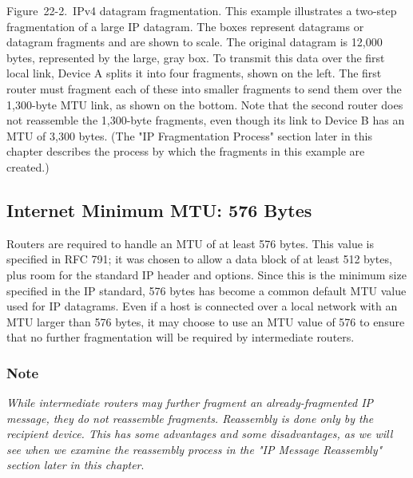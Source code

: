 \documentclass[b5paper,11pt]{memoir}
\begin{document}
\protect\hypertarget{ch22.htmlux5cux23ipv4_datagram_fragmentation_this_example}{}{}

\protect\hypertarget{ch22.htmlux5cux23I_mediaobject8_d1e23810}{}{}

Figure~22-2.~IPv4 datagram fragmentation. This example illustrates a
two-step fragmentation of a large IP datagram. The boxes represent
datagrams or datagram fragments and are shown to scale. The original
datagram is 12,000 bytes, represented by the large, gray box. To
transmit this data over the first local link, Device A splits it into
four fragments, shown on the left. The first router must fragment each
of these into smaller fragments to send them over the 1,300-byte MTU
link, as shown on the bottom. Note that the second router does not
reassemble the 1,300-byte fragments, even though its link to Device B
has an MTU of 3,300 bytes. (The "IP Fragmentation Process" section later
in this chapter describes the process by which the fragments in this
example are created.)

\subsection[Internet Minimum MTU: 576
Bytes]{\texorpdfstring{\protect\hypertarget{ch22.htmlux5cux23internet_minimum_mtu_576_bytes}{}{}Internet
Minimum MTU: 576 Bytes}{Internet Minimum MTU: 576 Bytes}}

\protect\hypertarget{ch22.htmlux5cux23idx-CHP-22-0803}{}{}Routers are
required to handle an MTU of at least 576 bytes. This value is specified
in RFC 791; it was chosen to allow a data block of at least 512 bytes,
plus room for the standard IP header and options. Since this is the
minimum size specified in the IP standard, 576 bytes has become a common
default MTU value used for IP datagrams. Even if a host is connected
over a local network with an MTU larger than 576 bytes, it may choose to
use an MTU value of 576 to ensure that no further fragmentation will be
required by intermediate routers.

\subsubsection[Note]{\texorpdfstring{\protect\hypertarget{ch22.htmlux5cux23note-82}{}{}Note}{Note}}

{\emph{While intermediate routers may further fragment an
already-fragmented IP message, they do not reassemble fragments.
Reassembly is done only by the recipient device. This has some
advantages and some disadvantages, as we will see when we examine the
reassembly process in the "IP Message Reassembly" section later in this
chapter}}.
\end{document}

